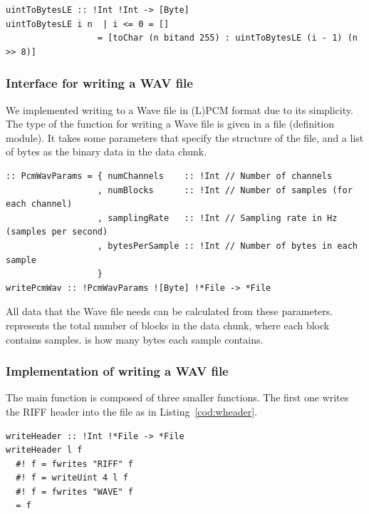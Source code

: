 \documentclass[runningheads]{llncs}
\begin{document}
\begin{lstlisting}[language=Clean,label={cod:tobytes},captionpos=b,caption={Converting an integer to a list of bytes}]
uintToBytesLE :: !Int !Int -> [Byte]
uintToBytesLE i n  | i <= 0 = []
                  = [toChar (n bitand 255) : uintToBytesLE (i - 1) (n >> 8)]
\end{lstlisting}

\subsubsection{Interface for writing a WAV file}
We implemented writing to a Wave file in (L)PCM format due to its
simplicity.
The type of the function for writing a Wave file is given in a
 file (definition module). It takes some parameters that
specify the structure of the file, and a list of bytes as the binary
data in the data chunk.
\begin{lstlisting}[language=Clean,label={cod:pcmdcl},captionpos=b,caption={Interface of writing a Wave file in PCM format}]
:: PcmWavParams = { numChannels    :: !Int // Number of channels
                  , numBlocks      :: !Int // Number of samples (for each channel)
                  , samplingRate   :: !Int // Sampling rate in Hz (samples per second)
                  , bytesPerSample :: !Int // Number of bytes in each sample
                  }
writePcmWav :: !PcmWavParams ![Byte] !*File -> *File
\end{lstlisting}

All data that the Wave file needs can be calculated from these
parameters.  represents the total number of blocks in
the data chunk, where each block contains  samples.
 is how many bytes each sample contains.

\subsubsection{Implementation of writing a WAV file}
The main function is composed of three smaller functions. The first one
writes the RIFF header into the file as in Listing~\ref{cod:wheader}.
\begin{lstlisting}[language=Clean,label={cod:wheader},captionpos=b,caption={Writing RIFF header into a file}]
writeHeader :: !Int !*File -> *File
writeHeader l f
  #! f = fwrites "RIFF" f
  #! f = writeUint 4 l f
  #! f = fwrites "WAVE" f
  = f
\end{lstlisting}
\end{document}
